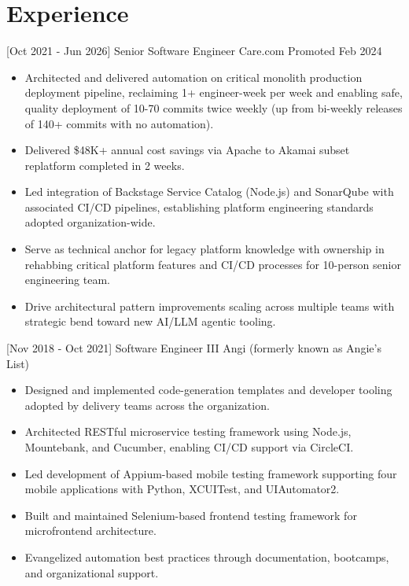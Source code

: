 \documentclass[]{moak-resume}
\begin{document}
\section{Experience}

  \begin{entrylist}
    \entry
    {[Oct 2021 - Jun 2026]}
    {Senior Software Engineer}
    {Care.com}
    {Promoted Feb 2024}
  \end{entrylist}
  \begin{itemize}
    \item \small\bodyfont Architected and delivered automation on critical monolith production deployment pipeline, reclaiming 1+ engineer-week per week and enabling safe, quality deployment of 10-70 commits twice weekly (up from bi-weekly releases of 140+ commits with no automation).
    \item \small\bodyfont Delivered \$48K+ annual cost savings via Apache to Akamai subset replatform completed in 2 weeks.
    \item \small\bodyfont Led integration of Backstage Service Catalog (Node.js) and SonarQube with associated CI/CD pipelines, establishing platform engineering standards adopted organization-wide.
    \item \small\bodyfont Serve as technical anchor for legacy platform knowledge with ownership in rehabbing critical platform features and CI/CD processes for 10-person senior engineering team.
    \item \small\bodyfont Drive architectural pattern improvements scaling across multiple teams with strategic bend toward new AI/LLM agentic tooling.
  \end{itemize}

 \begin{entrylist}
  \entry
    {[Nov 2018 - Oct 2021]}
    {Software Engineer III}
    {Angi (formerly known as Angie's List)}
    {}
\end{entrylist}
\begin{itemize}
  \item \small\bodyfont Designed and implemented code-generation templates and developer tooling adopted by delivery teams across the organization.
  \item \small\bodyfont Architected RESTful microservice testing framework using Node.js, Mountebank, and Cucumber, enabling CI/CD support via CircleCI.
  \item \small\bodyfont Led development of Appium-based mobile testing framework supporting four mobile applications with Python, XCUITest, and UIAutomator2.
  \item \small\bodyfont Built and maintained Selenium-based frontend testing framework for microfrontend architecture.
  \item \small\bodyfont Evangelized automation best practices through documentation, bootcamps, and organizational support.
\end{itemize}
\end{document}
